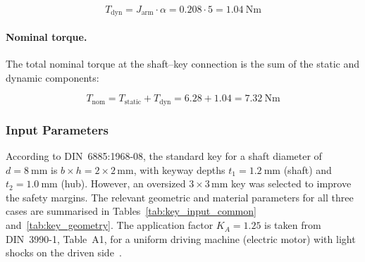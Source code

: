 \documentclass[11pt,a4paper,twoside,openright]{book}
\begin{document}
\begin{equation}
    T_{\text{dyn}} = J_{\text{arm}} \cdot \alpha = 0.208 \cdot 5 = \SI{1.04}{\newton\metre}
    \label{eq:dynamic_torque_calc}
\end{equation}
 
\paragraph{Nominal torque.}
The total nominal torque at the shaft--key connection is the sum of the static and dynamic components:
 
\begin{equation}
    T_{\text{nom}} = T_{\text{static}} + T_{\text{dyn}} = 6.28 + 1.04 = \SI{7.32}{\newton\metre}
    \label{eq:nominal_torque}
\end{equation}
 
\subsubsection{Input Parameters}
 
According to DIN~6885:1968-08, the standard key for a shaft diameter of $d = \SI{8}{\milli\metre}$ is $b \times h = 2 \times 2$\,\si{\milli\metre}, with keyway depths $t_1 = \SI{1.2}{\milli\metre}$ (shaft) and $t_2 = \SI{1.0}{\milli\metre}$ (hub). However, an oversized $3 \times 3$\,\si{\milli\metre} key was selected to improve the safety margins. The relevant geometric and material parameters for all three cases are summarised in Tables~\ref{tab:key_input_common} and~\ref{tab:key_geometry}. The application factor $K_A = 1.25$ is taken from DIN~3990-1, Table~A1, for a uniform driving machine (electric motor) with light shocks on the driven side~\cite{16ParallelKeys}.
 
\end{document}
